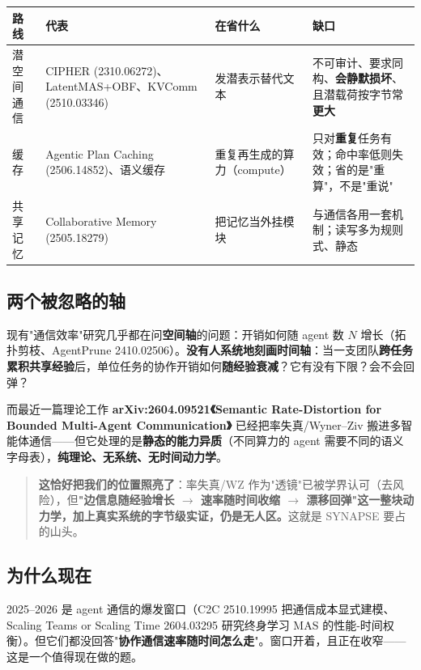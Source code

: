 \documentclass[UTF8,fontset=windows,11pt]{ctexart}
\newcommand{\key}[1]{\textbf{\textcolor{NavyBlue}{#1}}}
\begin{document}
\begin{table}[h]\footnotesize\centering
\renewcommand{\arraystretch}{1.25}
\begin{tabularx}{\linewidth}{@{}p{2.1cm}p{3.2cm}Y Y@{}}
\toprule
\textbf{路线} & \textbf{代表} & \textbf{在省什么} & \textbf{缺口} \\
\midrule
潜空间通信 & CIPHER (2310.06272)、LatentMAS+OBF、KVComm (2510.03346) & 发潜表示替代文本 & 不可审计、要求同构、\textbf{会静默损坏}、且潜载荷按字节常\textbf{更大} \\
缓存 & Agentic Plan Caching (2506.14852)、语义缓存 & 重复再生成的算力（compute） & 只对\textbf{重复}任务有效；命中率低则失效；省的是"重算"，不是"重说" \\
共享记忆 & Collaborative Memory (2505.18279) & 把记忆当外挂模块 & 与通信各用一套机制；读写多为规则式、静态 \\
\bottomrule
\end{tabularx}
\end{table}

\subsection{两个被忽略的轴}
现有"通信效率"研究几乎都在问\textbf{空间轴}的问题：开销如何随 agent 数 $N$ 增长（拓扑剪枝、AgentPrune 2410.02506）。\textbf{没有人系统地刻画时间轴}：当一支团队\textbf{跨任务累积共享经验}后，单位任务的协作开销如何\textbf{随经验衰减}？它有没有下限？会不会回弹？

而最近一篇理论工作 \key{arXiv:2604.09521《Semantic Rate-Distortion for Bounded Multi-Agent Communication》} 已经把率失真/Wyner--Ziv 搬进多智能体通信——但它处理的是\textbf{静态的能力异质}（不同算力的 agent 需要不同的语义字母表），\textbf{纯理论、无系统、无时间动力学}。

\begin{quote}\small
\textbf{这恰好把我们的位置照亮了}：率失真/WZ 作为"透镜"已被学界认可（去风险），但\textbf{"边信息随经验增长 $\to$ 速率随时间收缩 $\to$ 漂移回弹"这一整块动力学，加上真实系统的字节级实证，仍是无人区。}这就是 SYNAPSE 要占的山头。
\end{quote}

\subsection{为什么现在}
2025--2026 是 agent 通信的爆发窗口（C2C 2510.19995 把通信成本显式建模、Scaling Teams or Scaling Time 2604.03295 研究终身学习 MAS 的性能-时间权衡）。但它们都没回答"\textbf{协作通信速率随时间怎么走}"。窗口开着，且正在收窄——这是一个值得现在做的题。
\end{document}
